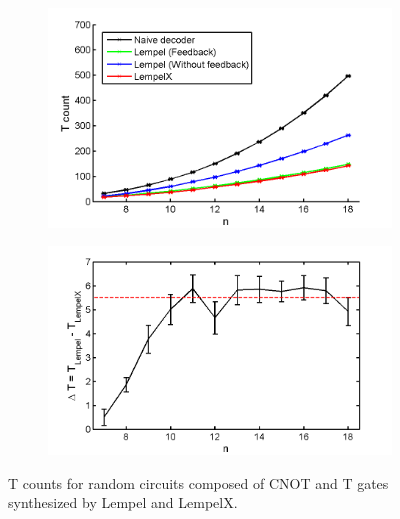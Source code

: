 \documentclass{article}
\theoremstyle{definition}
\theoremstyle{problem}
\theoremstyle{lemma}
\begin{document}
				\begin{figure}					
					\centering
					\begin{subfigure}[h]{0.6\textwidth}
						\includegraphics[width=\textwidth]{LX_vs_Lempel}
						\caption{}
						\label{f_random_a}
					\end{subfigure}
					\begin{subfigure}[h]{0.6\textwidth}
						\includegraphics[width=\textwidth]{DeltaT}
						\caption{}
						\label{f_random_b}
					\end{subfigure}
					\caption{T counts for random circuits composed of CNOT and T gates synthesized by Lempel and LempelX.}
					\label{f_random}
				\end{figure}
				
				\FloatBarrier
\end{document}
